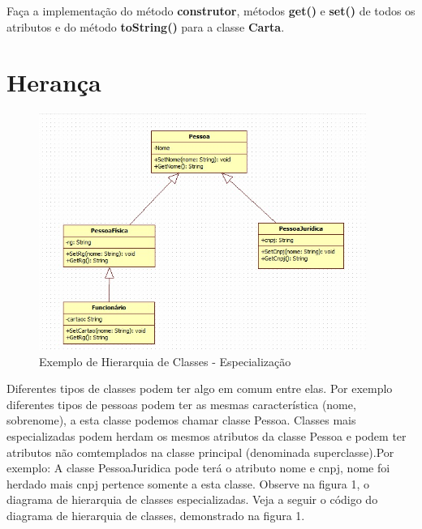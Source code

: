 \documentclass[10pt]{article}
\begin{document}
Faça a implementação do método \textbf{construtor}, métodos \textbf{get()} e \textbf{set()} de todos os atributos e do método \textbf{toString()} para a classe \textbf{Carta}.

\section{Herança}
\begin{figure}[ht]
	\centering
	\includegraphics[width=0.95\textwidth]{Exemplo_HierarquiaClasses.jpg}
	\caption{Exemplo de Hierarquia de Classes - Especialização}
	\label{fig:hieraqcollection}
\end{figure}

Diferentes tipos de classes podem ter algo em comum entre elas. Por exemplo diferentes tipos de pessoas podem ter as mesmas característica (nome, sobrenome), a esta classe podemos chamar classe Pessoa. Classes mais especializadas podem herdam os mesmos atributos da classe Pessoa e podem ter atributos não comtemplados na classe principal (denominada superclasse).Por exemplo: A classe PessoaJuridica pode terá o atributo nome e cnpj, nome foi herdado mais cnpj pertence somente a esta classe. Observe na figura 1, o diagrama de hierarquia de classes especializadas. Veja a seguir o código do diagrama de hierarquia de classes, demonstrado na figura 1.








\end{document}
